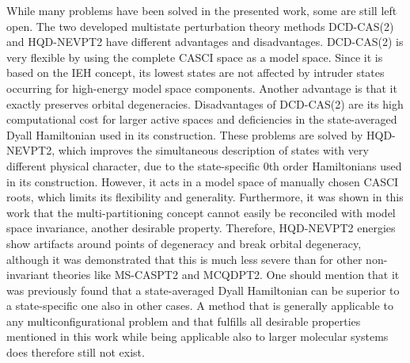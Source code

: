 While many problems have been solved in the presented work, some are still left open. The two developed multistate perturbation theory methods DCD-CAS(2) and HQD-NEVPT2 have different advantages and disadvantages. DCD-CAS(2) is very flexible by using the complete CASCI space as a model space. Since it is based on the IEH concept, its lowest states are not affected by intruder states occurring for high-energy model space components. Another advantage is that it exactly preserves orbital degeneracies. Disadvantages of DCD-CAS(2) are its high computational cost for larger active spaces and deficiencies in the state-averaged Dyall Hamiltonian used in its construction. These problems are solved by HQD-NEVPT2, which improves the simultaneous description of states with very different physical character, due to the state-specific 0th order Hamiltonians used in its construction. However, it acts in a model space of manually chosen CASCI roots, which limits its flexibility and generality. Furthermore, it was shown in this work that the multi-partitioning concept cannot easily be reconciled with model space invariance, another desirable property. Therefore, HQD-NEVPT2 energies show artifacts around points of degeneracy and break orbital degeneracy, although it was demonstrated that this is much less severe than for other non-invariant theories like MS-CASPT2 and MCQDPT2. One should mention that it was previously found that a state-averaged Dyall Hamiltonian can be superior to a state-specific one also in other cases.\cite{PastoHELMMAC_2008_174102, PastoHAELC_2009_12} A method that is generally applicable to any multiconfigurational problem and that fulfills all desirable properties mentioned in this work while being applicable also to larger molecular systems does therefore still not exist.

